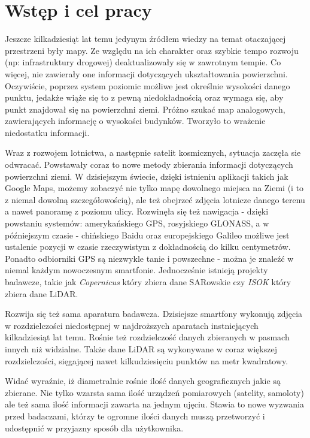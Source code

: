 \chapter{Wst\k{e}p i cel pracy}

Jeszcze kilkadziesiąt lat temu jedynym źródłem wiedzy na temat otaczającej przestrzeni były mapy.
Ze względu na ich charakter oraz szybkie tempo rozwoju (np: infrastruktury drogowej) deaktualizowały
się w zawrotnym tempie. Co więcej, nie zawierały one informacji dotyczących ukształtowania powierzchni.
Oczywiście, poprzez system poziomic możliwe jest określnie wysokości danego punktu, jedakże wiąże się to
z pewną niedokładnością oraz wymaga się, aby punkt znajdował się na powierzchni ziemi. Próżno szukać
map analogowych, zawierających informację o wysokości budynków. Tworzyło to wrażenie niedostatku informacji.

Wraz z rozwojem lotnictwa, a następnie satelit kosmicznych, sytuacja zaczęła sie odwracać. Powstawały coraz to
nowe metody zbierania informacji dotyczących powierzchni ziemi. W dzisiejszym świecie, dzięki istnieniu aplikacji
takich jak Google Maps, możemy zobaczyć nie tylko mapę dowolnego miejsca na Ziemi (i to z niemal dowolną szczegółowością),
ale też obejrzeć zdjęcia lotnicze danego terenu a nawet panoramę z poziomu ulicy. Rozwinęła się też nawigacja - dzięki powstaniu
systemów: amerykańskiego GPS, rosyjskiego GLONASS, a w późniejszym czasie - chińskiego Baidu oraz europejskiego Galileo możliwe
jest ustalenie pozycji w czasie rzeczywistym z dokładnością do kilku centymetrów. Ponadto odbiorniki GPS są niezwykle tanie i
powszechne - można je znaleźć w niemal każdym nowoczesnym smartfonie.
Jednocześnie istnieją projekty badawcze, takie jak
\textit{Copernicus}\cite{webiste:copernicus} który zbiera dane SARowskie czy \textit{ISOK}\cite{website:isok} który zbiera
dane LiDAR.

Rozwija się też sama aparatura badawcza. Dzisiejsze smartfony wykonują zdjęcia w rozdzielczości niedostępnej w najdroższych
aparatach instniejących kilkadziesiąt lat temu. Rośnie też rozdzielczość danych zbieranych w pasmach innych niż widzialne.
Także dane LiDAR są wykonywane w coraz większej rozdzielczości, sięgającej nawet kilkudziesięciu punktów na metr kwadratowy.

Widać wyraźnie, iż diametralnie rośnie ilość danych geograficznych jakie są zbierane. Nie tylko wzarsta sama ilość urządzeń
pomiarowych (satelity, samoloty) ale też sama ilość informacji zawarta na jednym ujęciu. Stawia to nowe wyzwania przed badaczami,
którzy te ogromne ilości danych muszą przetworzyć i udostępnić w przyjazny sposób dla użytkownika.

